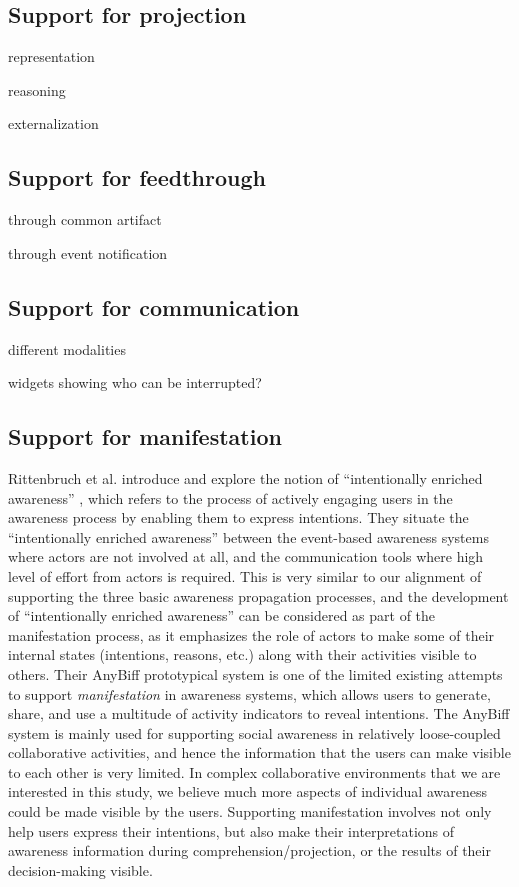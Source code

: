 \subsection{Support for projection} %
\label{sub:support_for_projection}
representation

reasoning

externalization


\subsection{Support for feedthrough} %
\label{sub:support_for_feedthrough}
through common artifact

through event notification


\subsection{Support for communication} %
\label{sub:support_for_communication}
different modalities

widgets showing who can be interrupted?


\subsection{Support for manifestation} %
\label{sub:support_for_manifestation}
Rittenbruch et al. introduce and explore the notion of ``intentionally enriched awareness'' \cite{Rittenbruch2007}, which refers to the process of actively engaging users in the awareness process by enabling them to express intentions. They situate the ``intentionally enriched awareness'' between the event-based awareness systems where actors are not involved at all, and the communication tools where high level of effort from actors is required. This is very similar to our alignment of supporting the three basic awareness propagation processes, and the development of ``intentionally enriched awareness'' can be considered as part of the manifestation process, as it emphasizes the role of actors to make some of their internal states (intentions, reasons, etc.) along with their activities visible to others. Their AnyBiff prototypical system is one of the limited existing attempts to support \emph{manifestation} in awareness systems, which allows users to generate, share, and use a multitude of activity indicators to reveal intentions. The AnyBiff system is mainly used for supporting social awareness in relatively loose-coupled collaborative activities, and hence the information that the users can make visible to each other is very limited. In complex collaborative environments that we are interested in this study, we believe much more aspects of individual awareness could be made visible by the users. Supporting manifestation involves not only help users express their intentions, but also make their interpretations of awareness information during comprehension/projection, or the results of their decision-making visible.


